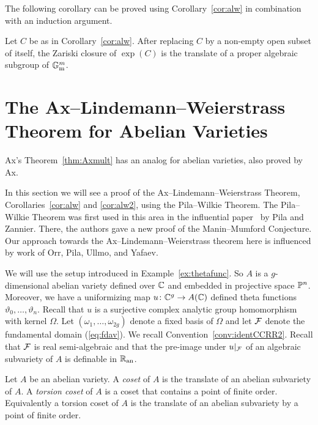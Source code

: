 The following corollary can be proved using Corollary~\ref{cor:alw}
in combination with an induction argument. 

\begin{corollary}
  \label{cor:alw2}
  Let $C$ be as in Corollary~\ref{cor:alw}. After replacing $C$ by a
  non-empty open subset of itself, the Zariski closure of $\exp(C)$ is
  the translate of a proper algebraic subgroup of ${\mathbb{G}}_{\mathrm{m}}^m$. 
\end{corollary}

\section{The Ax--Lindemann--Weierstrass Theorem for Abelian Varieties}
\label{sec:alwav}

Ax's Theorem~\ref{thm:Axmult} has an analog for abelian varieties,
also proved by Ax.

In this section we will see a proof of the Ax--Lindemann--Weierstrass
Theorem, Corollaries~\ref{cor:alw} and \ref{cor:alw2}, using the
Pila--Wilkie Theorem. The Pila--Wilkie Theorem was first used in this
area in the influential paper~\cite{PilaZannier} by Pila and Zannier.
There, the authors gave a new proof of the Manin--Mumford Conjecture.
Our approach towards the Ax--Lindemann--Weierstrass theorem here is
influenced by work of Orr, Pila, Ullmo, and Yafaev. 

We will use the setup introduced in Example~\ref{ex:thetafunc}. So $A$
is a $g$-dimensional abelian variety defined over ${\mathbb{C}}$ and embedded
in projective space ${\mathbb{P}}^n$. Moreover, we have a uniformizing map
$u\colon {\mathbb{C}}^g\rightarrow A({\mathbb{C}})$ defined theta functions
$\vartheta_0,\ldots,\vartheta_n$. Recall that $u$ is a surjective
complex analytic group homomorphism with kernel $\Omega$. Let
$(\omega_1,\ldots,\omega_{2g})$ denote a fixed basis of $\Omega$ and
let ${\mathcal F}$ denote the fundamental domain (\ref{eq:fdav}).
We recall Convention~\ref{conv:identCCRR2}. 
Recall that ${\mathcal F}$ is real semi-algebraic and that the pre-image under
$u|_{{\mathcal F}}$ of an algebraic subvariety of $A$ is definable in ${{\mathbb{R}}_{\mathrm{an}}}$.


\begin{definition}
  Let $A$ be an abelian variety. A \emph{coset} of $A$ is the translate of an
  abelian subvariety of $A$. A \emph{torsion coset} of $A$ is a coset
  that contains a point of finite order. Equivalently a torsion coset
  of $A$ is the translate of an abelian subvariety by a point of
  finite order. 
\end{definition}


